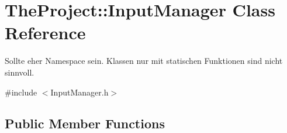 \hypertarget{class_the_project_1_1_input_manager}{}\section{The\+Project\+:\+:Input\+Manager Class Reference}
\label{class_the_project_1_1_input_manager}


Sollte eher Namespace sein. Klassen nur mit statischen Funktionen sind nicht sinnvoll.  




{\ttfamily \#include $<$Input\+Manager.\+h$>$}

\subsection*{Public Member Functions}
